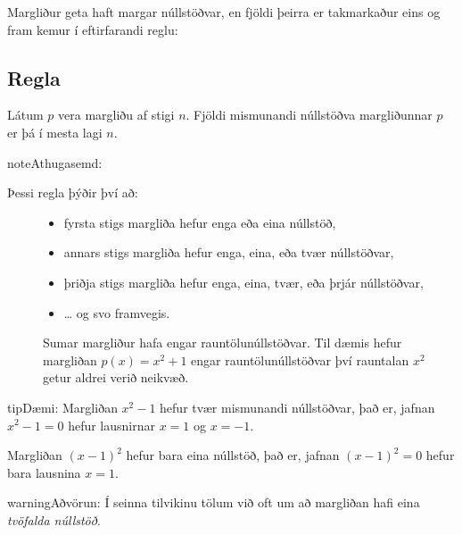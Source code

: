 \documentclass[a4paper,10pt,icelandic]{sphinxmanual}
\begin{document}
Margliður geta haft margar núllstöðvar, en fjöldi þeirra er takmarkaður eins og fram kemur í eftirfarandi reglu:


\subsection{Regla}
\label{\detokenize{Kafli06:regla}}
Látum \(p\) vera margliðu af stigi \(n\). Fjöldi mismunandi núllstöðva margliðunnar \(p\) er þá í mesta lagi \(n\).

\begin{sphinxadmonition}{note}{Athugasemd:}\begin{description}
\item[{Þessi regla þýðir því að:}] \leavevmode\begin{itemize}
\item {} 
fyrsta stigs margliða hefur enga eða eina núllstöð,

\item {} 
annars stigs margliða hefur enga, eina, eða tvær núllstöðvar,

\item {} 
þriðja stigs margliða hefur enga, eina, tvær, eða þrjár núllstöðvar,

\item {} 
… og svo framvegis.

\end{itemize}

Sumar margliður hafa engar rauntölunúllstöðvar.
Til dæmis hefur margliðan \(p(x)=x^2+1\) engar rauntölunúllstöðvar því rauntalan \(x^2\) getur aldrei verið neikvæð.

\end{description}
\end{sphinxadmonition}

\begin{sphinxadmonition}{tip}{Dæmi:}
 Margliðan \(x^2-1\) hefur tvær mismunandi núllstöðvar, það er, jafnan \(x^2-1=0\) hefur lausnirnar \(x=1\) og \(x=-1\).

 Margliðan \((x-1)^2\) hefur bara eina núllstöð, það er, jafnan \((x-1)^2=0\) hefur bara lausnina \(x=1\).

\begin{sphinxadmonition}{warning}{Aðvörun:}
Í seinna tilvikinu tölum við oft um að margliðan hafi eina \textit{tvöfalda núllstöð}.
\end{sphinxadmonition}
\end{sphinxadmonition}
\end{document}
